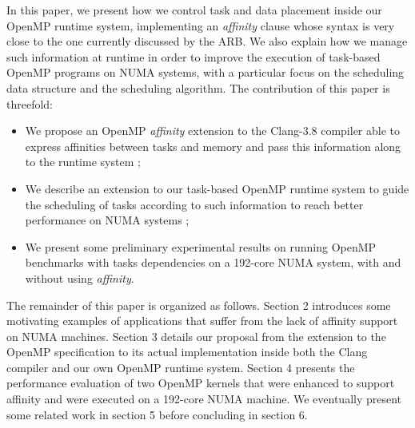 \documentclass{Styles/llncs}
\begin{document}
In this paper, we present how we control task and data placement inside our OpenMP runtime system, implementing an \emph{affinity} clause whose syntax is very close to the one currently discussed by the ARB. We also explain how we manage such information at runtime in order to improve the execution of task-based OpenMP programs on NUMA systems, with a particular focus on the scheduling data structure and the scheduling algorithm.
The contribution of this paper is threefold:
\begin{itemize}
\item We propose an OpenMP \emph{affinity} extension to the Clang-3.8 compiler able to express affinities between tasks and memory and pass this information along to the runtime system ;
\item We describe an extension to our task-based OpenMP runtime system to guide the scheduling of tasks according to such information to reach better performance on NUMA systems ;
\item We present some preliminary experimental results on running OpenMP benchmarks with tasks dependencies on a 192-core NUMA system, with and without using \emph{affinity}.
\end{itemize}


The remainder of this paper is organized as follows. Section 2 introduces some motivating examples of applications that suffer from the lack of affinity support on NUMA machines. Section 3 details our proposal from the extension to the OpenMP specification to its actual implementation inside both the Clang compiler and our own OpenMP runtime system. Section 4 presents the performance evaluation of two OpenMP kernels that were enhanced to support affinity and were executed on a 192-core NUMA machine. We eventually present some related work in section 5 before concluding in section 6.
\end{document}
